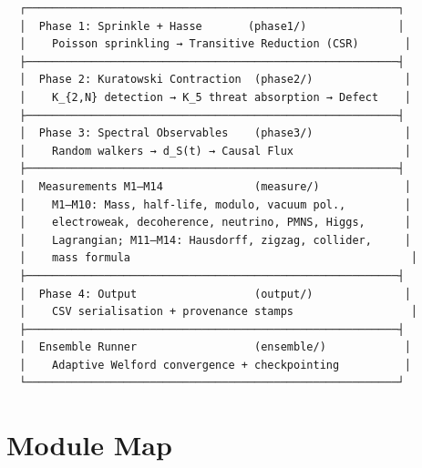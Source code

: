 \documentclass[11pt, a4paper, openany]{book}
\begin{document}
\begin{verbatim}
  ┌─────────────────────────────────────────────────────────┐
  │  Phase 1: Sprinkle + Hasse       (phase1/)              │
  │    Poisson sprinkling → Transitive Reduction (CSR)       │
  ├─────────────────────────────────────────────────────────┤
  │  Phase 2: Kuratowski Contraction  (phase2/)              │
  │    K_{2,N} detection → K_5 threat absorption → Defect    │
  ├─────────────────────────────────────────────────────────┤
  │  Phase 3: Spectral Observables    (phase3/)              │
  │    Random walkers → d_S(t) → Causal Flux                 │
  ├─────────────────────────────────────────────────────────┤
  │  Measurements M1–M14              (measure/)             │
  │    M1–M10: Mass, half-life, modulo, vacuum pol.,         │
  │    electroweak, decoherence, neutrino, PMNS, Higgs,      │
  │    Lagrangian; M11–M14: Hausdorff, zigzag, collider,     │
  │    mass formula                                           │
  ├─────────────────────────────────────────────────────────┤
  │  Phase 4: Output                  (output/)              │
  │    CSV serialisation + provenance stamps                  │
  ├─────────────────────────────────────────────────────────┤
  │  Ensemble Runner                  (ensemble/)            │
  │    Adaptive Welford convergence + checkpointing          │
  └─────────────────────────────────────────────────────────┘
\end{verbatim}

\section{Module Map}
\end{document}
